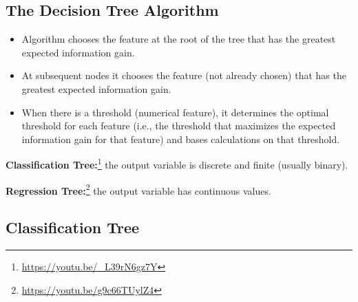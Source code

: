 \subsection{The Decision Tree Algorithm}

\begin{itemize}
    \item Algorithm chooses the feature at the root of the tree that has the greatest expected information gain.
    \item At subsequent nodes it chooses the feature (not already chosen) that has the greatest expected information gain.
    \item When there is a threshold (numerical feature), it determines the optimal threshold for each feature (i.e., the threshold that maximizes the expected information gain for that feature) and bases calculations on that threshold.
\end{itemize}

\textbf{Classification Tree:}\footnote{\url{https://youtu.be/_L39rN6gz7Y}} the output variable is discrete and finite (usually binary).

\textbf{Regression Tree:}\footnote{\url{https://youtu.be/g9c66TUylZ4}} the output variable has continuous values.

\subsection{Classification Tree}

